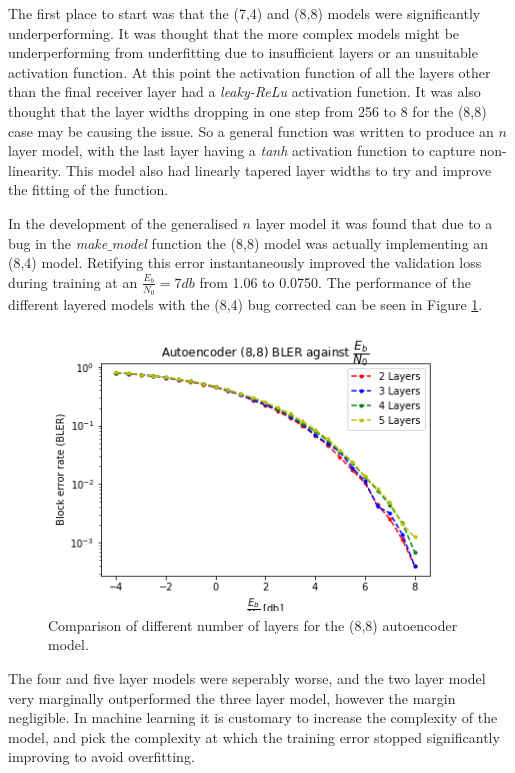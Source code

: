 \documentclass[12pt,onecolumn,letterpaper]{article}
\newcommand{\code}{\textit}
\newcommand\genfigsize{0.5}
\begin{document}
The first place to start was that the (7,4) and (8,8) models were significantly underperforming. It was thought that the more complex models might be underperforming from underfitting due to insufficient layers or an unsuitable activation function. At this point the activation function of all the layers other than the final receiver layer had a \code{leaky-ReLu} activation function. It was also thought that the layer widths dropping in one step from 256 to 8 for the (8,8) case may be causing the issue. So a general function was written to produce an $n$ layer model, with the last layer having a \code{tanh} activation function to capture non-linearity. This model also had linearly tapered layer widths to try and improve the fitting of the function. 

In the development of the generalised $n$ layer model it was found that due to a bug in the \code{make$\_$model} function the (8,8) model was actually implementing an (8,4) model. Retifying this error instantaneously improved the validation loss during training at an $\frac{E_b}{N_0} = 7db$ from 1.06 to 0.0750. The performance of the different layered models with the (8,4) bug corrected can be seen in Figure \ref{fig:NumLayersBler}.

\begin{figure}[t]
   \centering
   \includegraphics[width=\genfigsize\linewidth]{figures/autoencoder_8_8_bler_EbNo_2-5_layers.png}
   \caption{Comparison of different number of layers for the (8,8) autoencoder model.}
   \label{fig:NumLayersBler}
\end{figure}


The four and five layer models were seperably worse, and the two layer model very marginally outperformed the three layer model, however the margin negligible. In machine learning it is customary to increase the complexity of the model, and pick the complexity at which the training error stopped significantly improving to avoid overfitting.
\end{document}
